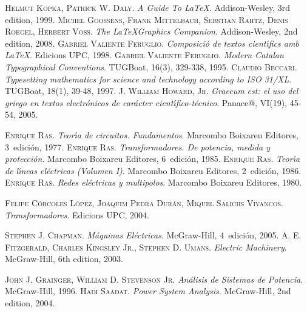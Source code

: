 \begin{thebibliography}{99}


     \textsc{Helmut Kopka, Patrick W. Daly}. \textit{A Guide To \LaTeX}.  Addison-Wesley, 3rd edition, 1999.
     \textsc{Michel Goossens, Frank Mittelbach, Sebstian Rahtz, Denis Roegel, Herbert Vo{\ss}}. \textit{The \LaTeX Graphics Companion}.  Addison-Wesley, 2nd edition, 2008.
     \textsc{Gabriel Valiente Feruglio}. \textit{Composici\'{o} de textos cient\'{\i}fics amb \LaTeX}.  Edicions UPC, 1998.
     \textsc{Gabriel Valiente Feruglio}. \textit{Modern Catalan Typographical Conventions}.  TUGBoat, 16(3), 329-338, 1995.
     \textsc{Claudio Beccari}. \textit{Typesetting mathematics for science and technology according to ISO 31/XL}.  TUGBoat, 18(1), 39-48, 1997.
     \textsc{J. William Howard, Jr}. \textit{Graecum est: el uso del griego en textos electr\'{o}nicos de car\'{a}cter cient\'{\i}fico-t\'{e}cnico}.  Panace@, VI(19), 45-54, 2005.


     \textsc{Enrique Ras}. \textit{Teor\'{\i}a de circuitos. Fundamentos}.  Marcombo Boixareu Editores, 3\textordfeminine\ edici\'{o}n, 1977.
     \textsc{Enrique Ras}. \textit{Transformadores. De potencia, medida y protecci\'{o}n}.  Marcombo Boixareu Editores, 6\textordfeminine\ edici\'{o}n, 1985.
     \textsc{Enrique Ras}. \textit{Teor\'{\i}a de l\'{\i}neas el\'{e}ctricas (Volumen I)}.  Marcombo Boixareu Editores, 2\textordfeminine\ edici\'{o}n, 1986.
     \textsc{Enrique Ras}. \textit{Redes el\'{e}ctricas y multipolos}.  Marcombo Boixareu Editores, 1980.

     \textsc{Felipe C\'{o}rcoles L\'{o}pez, Joaquim Pedra Dur\'{a}n, Miquel Salichs Vivancos}. \textit{Transformadores}.  Edicions UPC, 2004.

     \textsc{Stephen J. Chapman}. \textit{M\'{a}quinas El\'{e}ctricas}.  McGraw-Hill, 4\textordfeminine\ edici\'{o}n, 2005.
     \textsc{A. E. Fitzgerald, Charles Kingsley Jr., Stephen D. Umans}. \textit{Electric Machinery}.  McGraw-Hill, 6th edition, 2003.

     \textsc{John J. Grainger, William D. Stevenson Jr}. \textit{An\'{a}lisis de Sistemas de Potencia}.  McGraw-Hill, 1996.
     \textsc{Hadi Saadat}. \textit{Power System Analysis}.  McGraw-Hill, 2nd edition, 2004.


\end{thebibliography}
